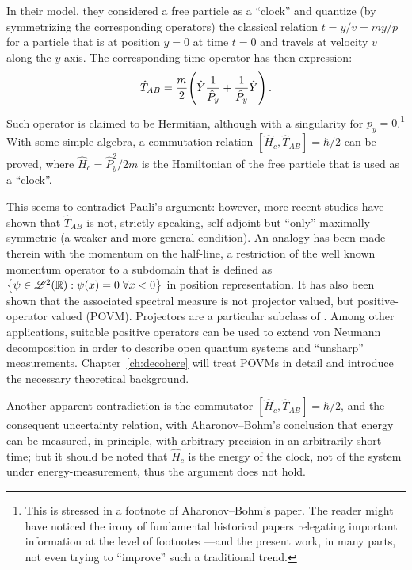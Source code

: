 In their model, they considered a free particle as a ``clock''
and quantize (by symmetrizing the corresponding operators)
the classical relation
$t = y / v = m y / p$
for a particle that is at position $y = 0$ at time $t = 0$ and travels at velocity $v$ along the $y$ axis.
The corresponding time operator has then expression:
\begin{equation}
  \hat{T}_{AB} = \frac{m}{2} \qty( \hat{Y} \frac{1}{\hat{P}_y} + \frac{1}{\hat{P}_y} \hat{Y} ) \,\text{.}
\end{equation}
Such operator is claimed to be Hermitian, although with a singularity for $p_{y} = 0$.\footnote{
  This is stressed in a footnote of Aharonov--Bohm's paper.
  The reader might have noticed the irony of fundamental historical papers
  relegating important information at the level of footnotes
  ---and the present work, in many parts, not even trying to ``improve'' such a traditional trend.
}
With some simple algebra, a commutation relation $[\hat{H}_{c}, \hat{T}_{AB}] = \hbar/2$
can be proved, where $\hat{H}_c = \hat{P}_y^2/2m$ is the Hamiltonian of the free particle that is used as a ``clock''.

This seems to contradict Pauli's argument: however, more recent studies
\parencite{MugaAB98, MugaAB99, MugaAB99Err}
have shown that
$\hat{T}_{AB}$ is not, strictly speaking, self-adjoint but ``only'' maximally symmetric
(a weaker and more general condition).
An analogy has been made therein with the momentum on the half-line,
a restriction of the well known momentum operator to a subdomain
that is defined as
$\qty{\psi \in \mathcal{L}^2(\mathbb{R}): \psi(x) = 0 \; \forall x < 0}$ in position representation.
It has also been shown that the associated spectral measure is not projector valued, but
positive-operator valued (POVM). Projectors are a particular subclass of .
Among other applications, suitable positive operators can be used to extend von Neumann decomposition
in order to describe
open quantum systems and ``unsharp'' measurements.
Chapter~\ref{ch:decohere} will treat POVMs in detail and introduce the necessary
theoretical background.

Another apparent contradiction is the commutator $[\hat{H}_{c}, \hat{T}_{AB}] = \hbar/2$,
and the consequent uncertainty relation, with Aharonov--Bohm's conclusion that
energy can be measured, in principle, with arbitrary precision in an arbitrarily short time;
but it should be noted that $\hat{H}_{c}$ is the energy of the clock, not of the system under energy-measurement,
thus the argument does not hold.

